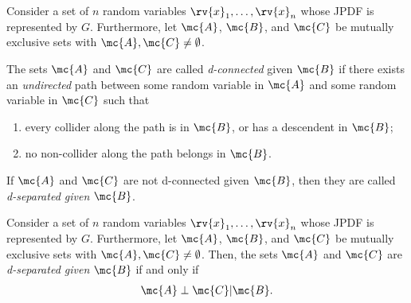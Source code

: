 \begin{mydefinition}
    Consider a set of $n$ random variables $\rv{x}_{1}, \ldots, \rv{x}_{n}$ whose JPDF is represented by $G$. 
    Furthermore, let $\mc{A}$, $\mc{B}$, and $\mc{C}$ be mutually exclusive sets with $\mc{A},\mc{C}\neq\emptyset$.

    The sets $\mc{A}$ and $\mc{C}$ are called \emph{d-connected} given $\mc{B}$ if there exists an \emph{undirected} path between some random variable in $\mc{A}$ and some random variable in $\mc{C}$ such that 
    \begin{enumerate}
        \item every collider along the path is in $\mc{B}$, or has a descendent in $\mc{B}$;
        \item no non-collider along the path belongs in $\mc{B}$.
    \end{enumerate}
    If $\mc{A}$ and $\mc{C}$ are not d-connected given $\mc{B}$, then they are called \emph{d-separated given $\mc{B}$}.
\end{mydefinition}

\begin{mytheorem}
   Consider a set of $n$ random variables $\rv{x}_{1}, \ldots, \rv{x}_{n}$ whose JPDF is represented by $G$. Furthermore, let $\mc{A}$, $\mc{B}$, and $\mc{C}$ be mutually exclusive sets with $\mc{A},\mc{C}\neq\emptyset$. Then, 
     the sets $\mc{A}$ and $\mc{C}$ are \emph{d-separated given} $\mc{B}$ if and only if 
     \begin{align}
         \mc{A} \perp \mc{C} | \mc{B}.
     \end{align}
\end{mytheorem}